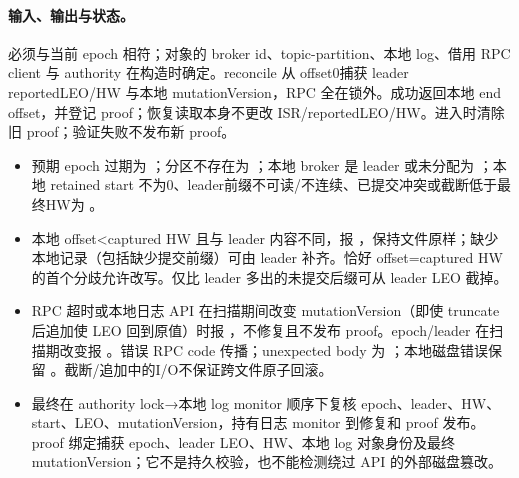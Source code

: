\paragraph{输入、输出与状态。} 必须与当前 epoch 相符；对象的 broker id、topic-partition、本地 log、借用 RPC client 与 authority 在构造时确定。reconcile 从 offset0捕获 leader reportedLEO/HW 与本地 mutationVersion，RPC 全在锁外。成功返回本地 end offset，并登记 proof；恢复读取本身不更改 ISR/reportedLEO/HW。进入时清除旧 proof；验证失败不发布新 proof。
\begin{itemize}
\item 预期 epoch 过期为 ；分区不存在为 ；本地 broker 是 leader 或未分配为 ；本地 retained start 不为0、leader前缀不可读/不连续、已提交冲突或截断低于最终HW为 。
\item 本地 offset<captured HW 且与 leader 内容不同，报 ，保持文件原样；缺少本地记录（包括缺少提交前缀）可由 leader 补齐。恰好 offset=captured HW 的首个分歧允许改写。仅比 leader 多出的未提交后缀可从 leader LEO 截掉。
\item RPC 超时或本地日志 API 在扫描期间改变 mutationVersion（即使 truncate 后追加使 LEO 回到原值）时报 ，不修复且不发布 proof。epoch/leader 在扫描期改变报 。错误 RPC code 传播；unexpected body 为 ；本地磁盘错误保留 。截断/追加中的I/O不保证跨文件原子回滚。
\item 最终在 authority lock→本地 log monitor 顺序下复核 epoch、leader、HW、start、LEO、mutationVersion，持有日志 monitor 到修复和 proof 发布。proof 绑定捕获 epoch、leader LEO、HW、本地 log 对象身份及最终 mutationVersion；它不是持久校验，也不能检测绕过 API 的外部磁盘篡改。
\end{itemize}
